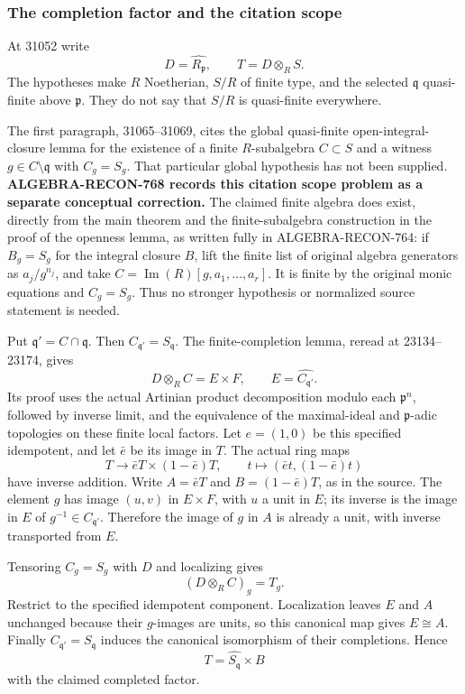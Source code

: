 \subsubsection{The completion factor and the citation scope}\label{the-completion-factor-and-the-citation-scope}

At 31052 write \[
 D=\widehat{R_{\mathfrak p}},\qquad T=D\otimes_R S.
\] The hypotheses make \(R\) Noetherian, \(S/R\) of finite type, and the selected \(\mathfrak q\) quasi-finite above \(\mathfrak p\). They do not say that \(S/R\) is quasi-finite everywhere.

The first paragraph, 31065--31069, cites the global quasi-finite open-integral-closure lemma for the existence of a finite \(R\)-subalgebra \(C\subset S\) and a witness \(g\in C\setminus\mathfrak q\) with \(C_g=S_g\). That particular global hypothesis has not been supplied. \textbf{ALGEBRA-RECON-768 records this citation scope problem as a separate conceptual correction.} The claimed finite algebra does exist, directly from the main theorem and the finite-subalgebra construction in the proof of the openness lemma, as written fully in ALGEBRA-RECON-764: if \(B_g=S_g\) for the integral closure \(B\), lift the finite list of original algebra generators as \(a_j/g^{n_j}\), and take \(C=\operatorname{Im}(R)[g,a_1,\ldots,a_r]\). It is finite by the original monic equations and \(C_g=S_g\). Thus no stronger hypothesis or normalized source statement is needed.

Put \(\mathfrak q'=C\cap\mathfrak q\). Then \(C_{\mathfrak q'}=S_{\mathfrak q}\). The finite-completion lemma, reread at 23134--23174, gives \[
 D\otimes_R C=E\times F,\qquad
 E=\widehat{C_{\mathfrak q'}}.
\] Its proof uses the actual Artinian product decomposition modulo each \(\mathfrak p^n\), followed by inverse limit, and the equivalence of the maximal-ideal and \(\mathfrak p\)-adic topologies on these finite local factors. Let \(e=(1,0)\) be this specified idempotent, and let \(\bar e\) be its image in \(T\). The actual ring maps \[
 T\longrightarrow \bar eT\times(1-\bar e)T,\qquad
 t\longmapsto(\bar et,(1-\bar e)t)
\] have inverse addition. Write \(A=\bar eT\) and \(B=(1-\bar e)T\), as in the source. The element \(g\) has image \((u,v)\) in \(E\times F\), with \(u\) a unit in \(E\); its inverse is the image in \(E\) of \(g^{-1}\in C_{\mathfrak q'}\). Therefore the image of \(g\) in \(A\) is already a unit, with inverse transported from \(E\).

Tensoring \(C_g=S_g\) with \(D\) and localizing gives \[
 (D\otimes_R C)_g=T_g.
\] Restrict to the specified idempotent component. Localization leaves \(E\) and \(A\) unchanged because their \(g\)-images are units, so this canonical map gives \(E\cong A\). Finally \(C_{\mathfrak q'}=S_{\mathfrak q}\) induces the canonical isomorphism of their completions. Hence \[
 T=\widehat{S_{\mathfrak q}}\times B
\] with the claimed completed factor.

